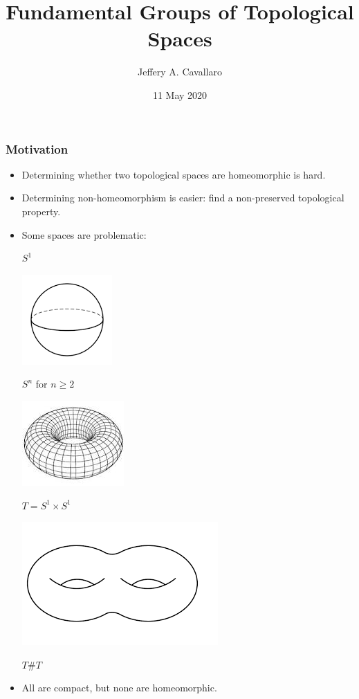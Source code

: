 \documentclass{beamer}
\title{Fundamental Groups of Topological Spaces}
\author{Jeffery A. Cavallaro}
\institute{San Jose State University \\ Spring 2020 \\ Math-275a}
\date{11 May 2020}
\begin{document}
\frame{\titlepage}

\begin{frame}
  \frametitle{Motivation}
  \begin{itemize}
  \item Determining whether two topological spaces are homeomorphic is hard.
  \item Determining non-homeomorphism is easier: find a non-preserved topological property.
  \item Some spaces are problematic:

    \begin{center}
      \begin{minipage}{1.5in}
        \centering

        \(S^1\)
      \end{minipage}
      \begin{minipage}{1.5in}
        \centering
        \includegraphics[scale=0.25]{sphere}

        \(S^n\) for \(n\ge2\)
      \end{minipage}

      \begin{minipage}{1.5in}
        \centering
        \includegraphics[scale=0.3]{torus}

        \(T=S^1\times S^1\)
      \end{minipage}
      \begin{minipage}{1.5in}
        \centering
        \includegraphics[scale=0.25]{dtorus}

        \(T\#T\)
      \end{minipage}
    \end{center}

  \item All are compact, but none are homeomorphic.
  \end{itemize}
\end{frame}
\end{document}
